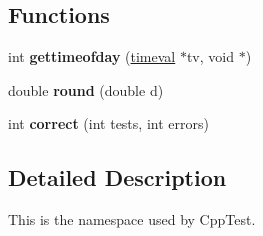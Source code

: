 \subsection*{Functions}
\begin{DoxyCompactItemize}
\item 
int {\bfseries gettimeofday} (\hyperlink{struct_test_1_1timeval}{timeval} $\ast$tv, void $\ast$)\hypertarget{namespace_test_a4f4a05d3868499da5898df2d9e1e2edf}{}\label{namespace_test_a4f4a05d3868499da5898df2d9e1e2edf}

\item 
double {\bfseries round} (double d)\hypertarget{namespace_test_ac51ad31f51e7c8515ffef01d24daa47c}{}\label{namespace_test_ac51ad31f51e7c8515ffef01d24daa47c}

\item 
int {\bfseries correct} (int tests, int errors)\hypertarget{namespace_test_adad8b76762cbc256f6b40cfde0eb1611}{}\label{namespace_test_adad8b76762cbc256f6b40cfde0eb1611}

\end{DoxyCompactItemize}


\subsection{Detailed Description}
This is the namespace used by Cpp\+Test. 
